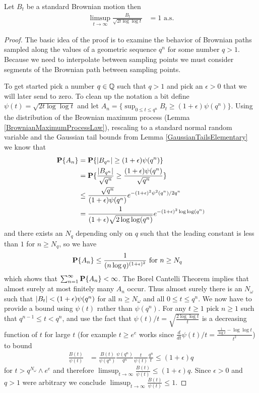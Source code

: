 \begin{thm}\label{LILBrownianMotion}Let
  $B_t$ be a standard Brownian motion then 
\begin{align*}
\limsup_{t \to \infty} \frac{B_t}{\sqrt{2t\log \log t}} &= 1 \text{ a.s.}
\end{align*}
\end{thm}
\begin{proof}
The basic idea of the proof is to examine the behavior of Brownian
paths sampled along the values of a geometric sequence $q^n$ for some
number $q > 1$.  Because we need to interpolate between sampling
points we must consider segments of the Brownian path between sampling
points.

To get started pick a number $q \in \mathbb{Q}$ such that $q >1$ and
pick an $\epsilon > 0$ that we will later send to zero.  To clean up
the notation a bit define $\psi(t) = \sqrt{2t\log \log t}$ and let
$A_n = \lbrace \sup_{0 \leq t \leq q^n} B_t \geq (1+\epsilon)\psi(q^n)
\rbrace$.  Using the distribution of the Brownian maximum process (Lemma \ref{BrownianMaximumProcessLaw}), rescaling to a
standard normal random variable and the Gaussian tail bounds from
Lemma \ref{GaussianTailsElementary} we know that 
\begin{align*}
\textbf{P}\{A_n\} &= 
\textbf{P}\{\left \vert B_{q^n} \right \vert \geq (1 + \epsilon)  \psi(q^n)\} \\
&=\textbf{P}\{\frac{\left \vert B_{q^n} \right \vert}{\sqrt{q^n}} \geq \frac{(1 + \epsilon)  \psi(q^n)}{\sqrt{q^n}}\} \\
&\leq \frac {\sqrt{q^n}}{(1 + \epsilon)  \psi(q^n)} e^{-(1+\epsilon)^2
  \psi^2(q^n)/2q^n} \\
&=\frac {1}{(1 + \epsilon)  \sqrt{2\log \log (q^n)}} e^{-(1+\epsilon)^2
  \log \log (q^n)} 
\end{align*}
and there exists an $N_q$ depending only on $q$ such that the leading
constant is less than $1$ for $n \geq N_q$, so we have
\begin{align*}
\textbf{P}\{A_n\} &\leq \frac{1}{(n \log q)^{(1+\epsilon)^2}} 
\text{ for $n \geq N_q$}
\end{align*}
which shows that $\sum_{n=1}^\infty \textbf{P}\{A_n\} < \infty$. The
Borel Cantelli Theorem implies that almost surely at most finitely
many $A_n$ occur.  Thus almost surely there is an $N_\omega$ such that
$\left \vert B_{t} \right \vert < (1 + \epsilon)  \psi(q^n)$ for all $n \geq N_\omega$
and all $0 \leq t \leq q^n$.  We now have to provide a bound using
$\psi(t)$ rather than $\psi(q^n)$.  For any $t \geq 1$ pick $n \geq 1$
such that $q^{n-1} \leq t < q^n$, and use the fact that $\psi(t)/t =
\sqrt{\frac{2\log\log t}{t}}$ is
a decreasing function of $t$ for large $t$ (for example $t \geq e^e$ works
since $\frac{d}{dt} \psi(t)/t = \frac{\frac{1}{\log t} - \log \log t}{t^2}$) to bound
\begin{align*}
\frac{B(t)}{\psi(t)} &=
\frac{B(t)}{\psi(q^n)}\frac{\psi(q^n)}{q^n}\frac{t}{\psi(t)}\frac{q^n}{t}
\leq (1+\epsilon) q
\end{align*}
for $t > q^{N_\omega} \wedge e^e$ and therefore $\limsup_{t \to \infty}
\frac{B(t)}{\psi(t)} \leq (1+\epsilon)q$.  Since $\epsilon > 0$ and $q
> 1$  were
arbitrary we conclude $\limsup_{t \to \infty}\frac{B(t)}{\psi(t)} \leq 1$.



\end{proof}
